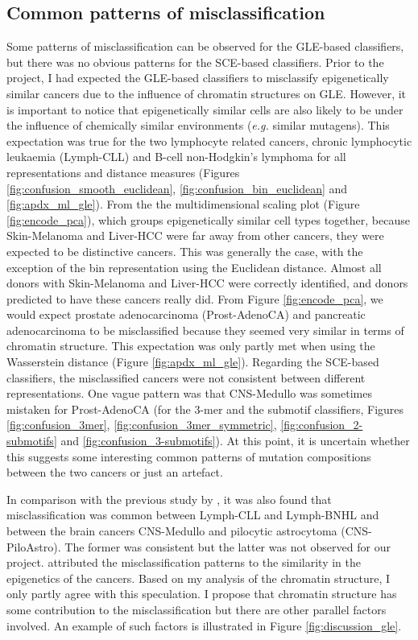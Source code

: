 \subsection{Common patterns of misclassification}
Some patterns of misclassification can be observed for the GLE-based classifiers, but there was no obvious patterns for the SCE-based classifiers. Prior to the project, I had expected the GLE-based classifiers to misclassify epigenetically similar cancers due to the influence of chromatin structures on GLE. However, it is important to notice that epigenetically similar cells are also likely to be under the influence of chemically similar environments (\textit{e.g.} similar mutagens). This expectation was true for the two lymphocyte related cancers, chronic lymphocytic leukaemia (Lymph-CLL) and B-cell non-Hodgkin's lymphoma for all representations and distance measures (Figures \ref{fig:confusion_smooth_euclidean}, \ref{fig:confusion_bin_euclidean} and \ref{fig:apdx_ml_gle}). From the the multidimensional scaling plot (Figure \ref{fig:encode_pca}), which groups epigenetically similar cell types together, because Skin-Melanoma and Liver-HCC were far away from other cancers, they were expected to be distinctive cancers. This was generally the case, with the exception of the bin representation using the Euclidean distance. Almost all donors with Skin-Melanoma and Liver-HCC were correctly identified, and donors predicted to have these cancers really did. From Figure \ref{fig:encode_pca}, we would expect prostate adenocarcinoma (Prost-AdenoCA) and pancreatic adenocarcinoma to be misclassified because they seemed very similar in terms of chromatin structure. This expectation was only partly met when using the Wasserstein distance (Figure \ref{fig:apdx_ml_gle}). Regarding the SCE-based classifiers, the misclassified cancers were not consistent between different representations. One vague pattern was that CNS-Medullo was sometimes mistaken for Prost-AdenoCA (for the 3-mer and the submotif classifiers, Figures \ref{fig:confusion_3mer}, \ref{fig:confusion_3mer_symmetric}, \ref{fig:confusion_2-submotifs} and \ref{fig:confusion_3-submotifs}). At this point, it is uncertain whether this suggests some interesting common patterns of mutation compositions between the two cancers or just an artefact. 

In comparison with the previous study by \citet{Jiao2020}, it was also found that misclassification was common between Lymph-CLL and Lymph-BNHL and between the brain cancers CNS-Medullo and pilocytic astrocytoma (CNS-PiloAstro). The former was consistent but the latter was not observed for our project. \citet{Jiao2020} attributed the misclassification patterns to the similarity in the epigenetics of the cancers. Based on my analysis of the chromatin structure, I only partly agree with this speculation. I propose that chromatin structure has some contribution to the misclassification but there are other parallel factors involved. An example of such factors is illustrated in Figure \ref{fig:discussion_gle}.

